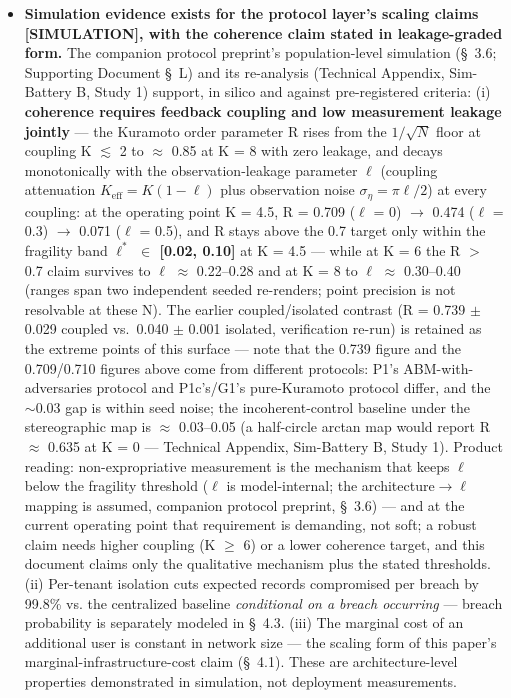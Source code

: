 \documentclass[11pt,twocolumn]{article}
\begin{document}
\begin{itemize}
\item \textbf{Simulation evidence exists for the protocol layer's scaling claims [SIMULATION], with the coherence claim stated in leakage-graded form.} The companion protocol preprint's population-level simulation (\S~3.6; Supporting Document \S~L) and its re-analysis (Technical Appendix, Sim-Battery B, Study 1) support, in silico and against pre-registered criteria: (i) \textbf{coherence requires feedback coupling and low measurement leakage jointly} --- the Kuramoto order parameter R rises from the $1/\sqrt{N}$ floor at coupling K $\lesssim$ 2 to $\approx$ 0.85 at K = 8 with zero leakage, and decays monotonically with the observation-leakage parameter $\ell$ (coupling attenuation $K_{\mathrm{eff}} = K(1-\ell)$ plus observation noise $\sigma_{\eta} = \pi\ell/2$) at every coupling: at the operating point K = 4.5, R = 0.709 ($\ell$ = 0) $\rightarrow$ 0.474 ($\ell$ = 0.3) $\rightarrow$ 0.071 ($\ell$ = 0.5), and R stays above the 0.7 target only within the fragility band \textbf{$\ell^{*}$ $\in$ [0.02, 0.10]} at K = 4.5 --- while at K = 6 the R $>$ 0.7 claim survives to $\ell$ $\approx$ 0.22--0.28 and at K = 8 to $\ell$ $\approx$ 0.30--0.40 (ranges span two independent seeded re-renders; point precision is not resolvable at these N). The earlier coupled/isolated contrast (R = 0.739 $\pm$ 0.029 coupled vs.\ 0.040 $\pm$ 0.001 isolated, verification re-run) is retained as the extreme points of this surface --- note that the 0.739 figure and the 0.709/0.710 figures above come from different protocols: P1's ABM-with-adversaries protocol and P1c's/G1's pure-Kuramoto protocol differ, and the $\sim$0.03 gap is within seed noise; the incoherent-control baseline under the stereographic map is $\approx$ 0.03--0.05 (a half-circle arctan map would report R $\approx$ 0.635 at K = 0 --- Technical Appendix, Sim-Battery B, Study 1). Product reading: non-expropriative measurement is the mechanism that keeps $\ell$ below the fragility threshold ($\ell$ is model-internal; the architecture$\to\ell$ mapping is assumed, companion protocol preprint, \S~3.6) --- and at the current operating point that requirement is demanding, not soft; a robust claim needs higher coupling (K $\geq$ 6) or a lower coherence target, and this document claims only the qualitative mechanism plus the stated thresholds. (ii) Per-tenant isolation cuts expected records compromised per breach by 99.8\% vs. the centralized baseline \emph{conditional on a breach occurring} --- breach probability is separately modeled in \S~4.3. (iii) The marginal cost of an additional user is constant in network size --- the scaling form of this paper's marginal-infrastructure-cost claim (\S~4.1). These are architecture-level properties demonstrated in simulation, not deployment measurements.


\end{itemize}
\end{document}
